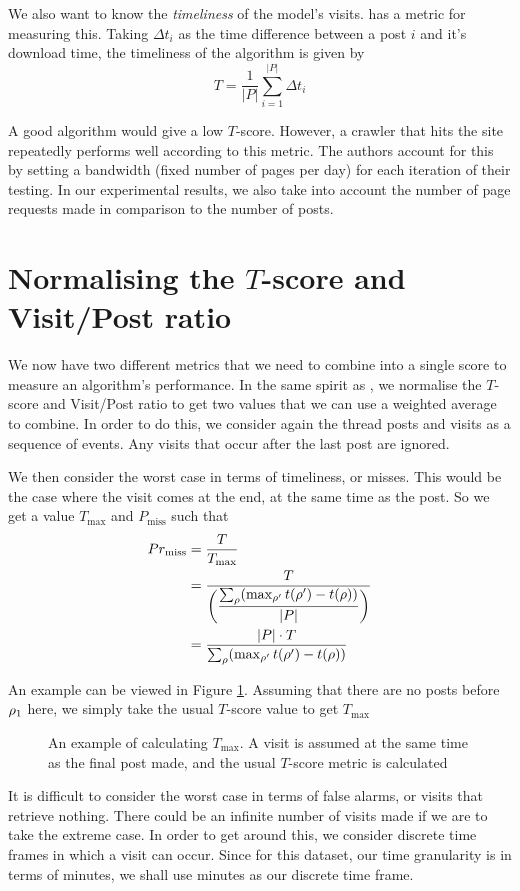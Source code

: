 We also want to know the \emph{timeliness} of the model's visits.  
 has a metric for measuring this. Taking $\Delta t_i$ as the 
time difference between a post $i$ and it's download time, the timeliness of the 
algorithm is given by
\[
	T = \frac{1}{|P|} \sum^{|P|}_{i=1}\Delta t_i
\]

A good algorithm would give a low $T$-score. However, a crawler that hits the 
site repeatedly performs well according to this metric. The authors account for 
this by setting a bandwidth (fixed number of pages per day) for each iteration 
of their testing. In our experimental results, we also take into account the 
number of page requests made in comparison to the number of posts. %


\section{Normalising the $T$-score and Visit/Post ratio}
We now have two different metrics that we need to combine into a single score to 
measure an algorithm's performance. In the same spirit as 
, we normalise the $T$-score and Visit/Post ratio to get 
two values that we can use a weighted average to combine. In order to do this, 
we consider again the thread posts and visits as a sequence of events. Any 
visits that occur after the last post are ignored.

We then consider the worst case in terms of timeliness, or misses. This would be 
the case where the visit comes at the end, at the same time as the post. So we 
get a value $T_{\max}$ and $P_{\text{miss}}$ such that
\begin{align*}
	\P_{\text{miss}} &= \frac{T}{T_{\max}}\\
							  &= \dfrac{T}{\left(
					\dfrac{%
			\sum_\post (\max_{\post'}t(\post') - t(\post))}{|P|}\right)} \\
					&= \dfrac{|P| \cdot T}{%
		\sum_\post (\max_{\post'}t(\post') - t(\post))}
\end{align*}

\pagebreak
An example can be viewed in Figure \ref{fig:norm_t_score}. Assuming that there 
are no posts before $\rho_1$ here, we simply take the usual $T$-score value to 
get $T_\text{max}$
\begin{figure}
\begin{center}

	\end{center}
\caption{An example of calculating $T_\text{max}$. A visit is assumed at the 
same time as the final post made, and the usual $T$-score metric is 
calculated}\label{fig:norm_t_score}
\end{figure}
It is difficult to consider the worst case in terms of false alarms, or visits 
that retrieve nothing. There could be an infinite number of visits made if we 
are to take the extreme case. In order to get around this, we consider discrete 
time frames in which a visit can occur. Since for this dataset, our time 
granularity is in terms of minutes, we shall use minutes as our discrete time 
frame.

